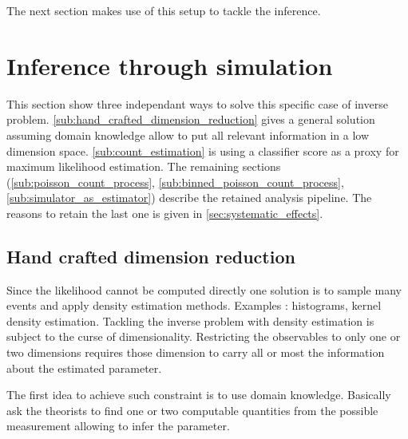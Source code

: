 The next section makes use of this setup to tackle the inference.






\section{Inference through simulation} %
\label{sec:inference_through_simulation}






This section show three independant ways to solve this specific case of inverse problem.
\autoref{sub:hand_crafted_dimension_reduction} gives a general solution assuming domain knowledge allow to put all relevant information in a low dimension space.
\autoref{sub:count_estimation} is using a classifier score as a proxy for maximum likelihood estimation.
The remaining sections (\autoref{sub:poisson_count_process}, \autoref{sub:binned_poisson_count_process}, \autoref{sub:simulator_as_estimator}) describe the retained analysis pipeline.
The reasons to retain the last one is given in \autoref{sec:systematic_effects}.









\subsection{Hand crafted dimension reduction} %
\label{sub:hand_crafted_dimension_reduction}


Since the likelihood cannot be computed directly one solution is to sample many events and apply density estimation methods.
Examples : histograms, kernel density estimation.
Tackling the inverse problem with density estimation is subject to the curse of dimensionality.
Restricting the observables to only one or two dimensions requires those dimension to carry all or most the information about the estimated parameter.

The first idea to achieve such constraint is to use domain knowledge.
Basically ask the theorists to find one or two computable quantities from the possible measurement allowing to infer the parameter.

